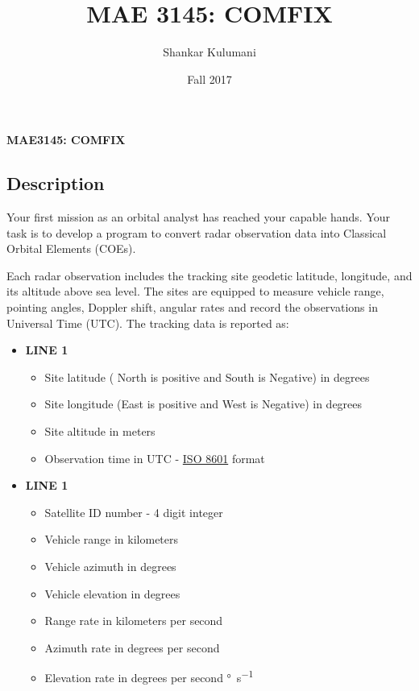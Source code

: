 \documentclass[11pt, reqno]{article}    %
\title{MAE 3145: COMFIX}
\author{Shankar Kulumani}
\date{Fall 2017}                          %
\begin{document}
\begin{center}
{\Large \textbf{MAE3145: COMFIX}}
\end{center}
\subsection*{Description}
Your first mission as an orbital analyst has reached your capable hands.
Your task is to develop a program to convert radar observation data into Classical Orbital Elements (COEs).

Each radar observation includes the tracking site geodetic latitude, longitude, and its altitude above sea level.
The sites are equipped to measure vehicle range, pointing angles, Doppler shift, angular rates and record the observations in Universal Time (UTC).
The tracking data is reported as:
\begin{itemize}
    \item \textbf{LINE 1}
        \begin{itemize}
            \item Site latitude ( North is positive and South is Negative) in degrees
            \item Site longitude (East is positive and West is Negative) in degrees
            \item Site altitude in meters
            \item Observation time in UTC - \href{https://en.wikipedia.org/wiki/ISO_8601}{ISO 8601} format
        \end{itemize}
    \item \textbf{LINE 1}
        \begin{itemize}
            \item Satellite ID number - 4 digit integer
            \item Vehicle range in kilometers
            \item Vehicle azimuth in degrees
            \item Vehicle elevation in degrees
            \item Range rate in kilometers per second
            \item Azimuth rate in degrees per second
            \item Elevation rate in degrees per second \si{\degree\per\second}
        \end{itemize}
\end{itemize}
\end{document}
